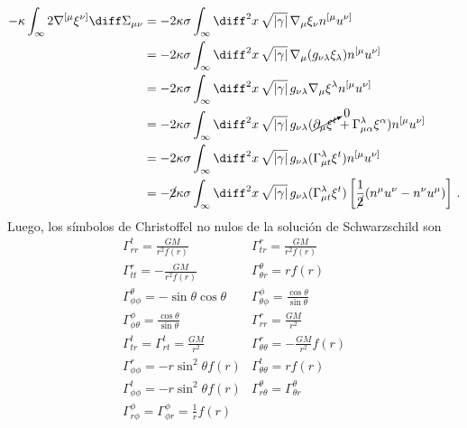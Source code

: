 \documentclass[../Main.tex]{subfiles}
\begin{document}
\begin{align}\notag
-\kappa\int_{\infty}2\nabla^{[\mu}\xi^{\nu]}\diff\Sigma_{\mu\nu}&=-2\kappa\sigma\int_{\infty}\diff^{2}x\,\sqrt{|\gamma|}\,\nabla_{\mu}\xi_{\nu}n^{[\mu}u^{\nu]}\\ \notag
&=-2\kappa\sigma\int_{\infty}\diff^{2}x\,\sqrt{|\gamma|}\,\nabla_{\mu}(g_{\nu\lambda}\xi_{\lambda})n^{[\mu}u^{\nu]}\\ \notag
&=-2\kappa\sigma\int_{\infty}\diff^{2}x\,\sqrt{|\gamma|}\,g_{\nu\lambda}\nabla_{\mu}\xi^{\lambda}n^{[\mu}u^{\nu]}\\ \notag
&=-2\kappa\sigma\int_{\infty}\diff^{2}x\,\sqrt{|\gamma|}\,g_{\nu\lambda}(\cancelto{0}{\partial_{\mu}\xi^{t}}+\Gamma^{\lambda}_{\mu\alpha}\xi^{\alpha})n^{[\mu}u^{\nu]}\\ \notag
&=-2\kappa\sigma\int_{\infty}\diff^{2}x\,\sqrt{|\gamma|}\,g_{\nu\lambda}(\Gamma^{\lambda}_{\mu t}\xi^{t})n^{[\mu}u^{\nu]}\\
&=-\cancel{2}\kappa\sigma\int_{\infty}\diff^{2}x\,\sqrt{|\gamma|}\,g_{\nu\lambda}(\Gamma^{\lambda}_{\mu t}\xi^{t})\left[\frac{1}{\cancel{2}}(n^{\mu}u^{\nu}-n^{\nu}u^{\mu})\right] \, .
\end{align}
Luego, los símbolos de Christoffel no nulos de la solución de Schwarzschild son
\begin{equation}
    \begin{array}{cc}
\Gamma^t_{rr} = \frac{GM}{r^2 f(r)} &
\Gamma^r_{tr} = \frac{GM}{r^2 f(r)} \\
\Gamma^r_{tt} = -\frac{GM}{r^2 f(r)} &
\Gamma^\theta_{\theta r} = rf(r) \\
\Gamma^\theta_{\phi\phi} = -\sin\theta\cos\theta &
\Gamma^\phi_{\theta\phi} = \frac{\cos\theta}{\sin\theta} \\
\Gamma^\phi_{\phi\theta} = \frac{\cos\theta}{\sin\theta} &
\Gamma^r_{rr} = \frac{GM}{r^2}\\
\Gamma^t_{tr} = \Gamma^t_{rt} = \frac{GM}{r^2} &
\Gamma^r_{\theta\theta} = -\frac{GM}{r^2}f(r) \\
\Gamma^r_{\phi\phi} = -r\sin^2\theta f(r) &
\Gamma^t_{\theta\theta} = rf(r) \\
\Gamma^t_{\phi\phi} = -r\sin^2\theta f(r) &
\Gamma^\theta_{r\theta} = \Gamma^\theta_{\theta r} \\
\Gamma^\phi_{r\phi} = \Gamma^\phi_{\phi r} = \frac{1}{r}f(r) &
\end{array}
\end{equation}
\end{document}
